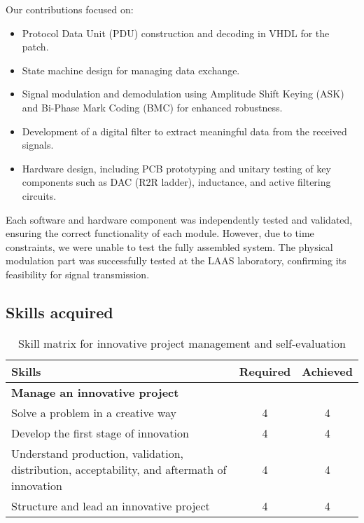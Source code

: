 \noindent Our contributions focused on:
\begin{itemize}
    \item Protocol Data Unit (PDU) construction and decoding in VHDL for the patch.
    \item State machine design for managing data exchange.
    \item Signal modulation and demodulation using Amplitude Shift Keying (ASK) and Bi-Phase Mark Coding (BMC) for enhanced robustness.
    \item Development of a digital filter to extract meaningful data from the received signals.
    \item Hardware design, including PCB prototyping and unitary testing of key components such as DAC (R2R ladder), inductance, and active filtering circuits.
\end{itemize}

\noindent Each software and hardware component was independently tested and validated, ensuring the correct functionality of each module. However, due to time constraints, we were unable to test the fully assembled system. The physical modulation part was successfully tested at the LAAS laboratory, confirming its feasibility for signal transmission.

\subsection{Skills acquired}



\begin{table}[H]
    \centering
    \renewcommand{\arraystretch}{1.5} %
    \begin{tabular}{|p{11cm}|c|c|}
    \hline
    \rowcolor[gray]{0.8}
    \textbf{Skills} & \textbf{Required} & \textbf{Achieved} \\ \hline
    \rowcolor[gray]{0.9} \textbf{Manage an innovative project} &  &  \\ \hline
    Solve a problem in a creative way & 4 & 4 \\ \hline
    Develop the first stage of innovation & 4 & 4 \\ \hline
    Understand production, validation, distribution, acceptability, and aftermath of innovation & 4 & 4 \\ \hline
    Structure and lead an innovative project & 4 & 4 \\ \hline
    \end{tabular}
    \caption{Skill matrix for innovative project management and self-evaluation}
    \label{table:skills-innovative}
\end{table}

